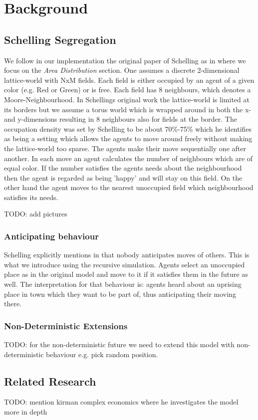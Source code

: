 \section{Background}

\subsection{Schelling Segregation}
We follow in our implementation the original paper of Schelling as in \cite{schelling_dynamic_1971} where we focus on the \textit{Area Distribution} section. One assumes a discrete 2-dimensional lattice-world with NxM fields. Each field is either occupied by an agent of a given color (e.g. Red or Green) or is free. Each field has 8 neighbours, which denotes a Moore-Neighbourhood. In Schellings original work the lattice-world is limited at its borders but we assume a torus world which is wrapped around in both the x- and y-dimensions resulting in 8 neighbours also for fields at the border. The occupation density was set by Schelling to be about 70\%-75\% which he identifies as being a setting which allows the agents to move around freely without making the lattice-world too sparse. The agents make their move sequentially one after another. In each move an agent calculates the number of neighbours which are of equal color. If the number satisfies the agents needs about the neighbourhood then the agent is regarded as being 'happy' and will stay on this field. On the other hand the agent moves to the nearest unoccupied field which neighbourhood satisfies its needs.

TODO: add pictures

\subsubsection{Anticipating behaviour}
Schelling explicitly mentions in \cite{schelling_dynamic_1971} that nobody anticipates moves of others. This is what we introduce using the recursive simulation. Agents select an unoccupied place as in the original model and move to it if it satisfies them in the future as well. The interpretation for that behaviour is: agents heard about an uprising place in town which they want to be part of, thus anticipating their moving there.

\subsubsection{Non-Deterministic Extensions}
TODO: for the non-deterministic future we need to extend this model with non-deterministic behaviour e.g. pick random position.

\subsection{Related Research}
TODO: \cite{kirman_complex_2010} mention kirman complex economics where he investigates the model more in depth